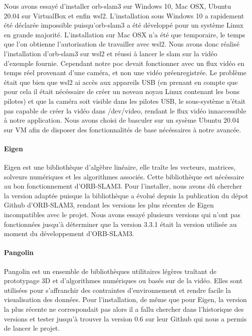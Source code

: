 \documentclass[11pt]{article}
\begin{document}
          Nous avons essayé d'installer \acrshort{orb}-\acrshort{slam}3 sur Windows 10, Mac OSX, Ubuntu 20.04 sur VirtualBox et enfin 
          \acrshort{wsl2}. L'installation sous Windows 10 a rapidement été déclarée impossible puisqu'\acrshort{orb}-\acrshort{slam}3
          a été développé pour un système Linux en grande majorité. L'installation sur Mac OSX n'a été que temporaire, le temps que l'on 
          obtienne l'autorisation de travailler avec \acrshort{wsl2}.
          Nous avons donc réalisé l'installation d'\acrshort{orb}-\acrshort{slam}3 sur \acrshort{wsl2} et réussi à lancer le \acrshort{slam}
          sur la vidéo d'exemple fournie. Cependant notre \acrshort{poc} devait fonctionner avec un flux vidéo en temps réel provenant
          d'une caméra, et non une vidéo préenregistrée. Le problème était que bien que wsl2 ai accès aux appareils USB (en prenant en compte 
          que pour cela il était nécéssaire de créer un noveau noyau Linux contenant les bons pilotes) et que la caméra soit visible dans les
          pilotes USB, le sous-système n'était pas capable de créer la vidéo dans /dev/video, rendant le flux vidéo innaccessible à notre
          application. Nous avons choisi de basculer sur un sysème Ubuntu 20.04 sur VM afin de disposer des fonctionnalités de base
          nécéssaires à notre avancée.     

        \paragraph{Eigen}
          Eigen est une bibliothèque d'algèbre linéaire, elle traîte les vecteurs, matrices, solveurs numériques et les algorithmes
          associés. Cette bibliothèque est nécéssaire au bon fonctionnement d'ORB-SLAM3. Pour l'installer, nous avons dû chercher la version 
          adaptée puisque la bibliothèque a évolué depuis la publication du dépot Github d'ORB-SLAM3, rendant les versions les plus récentes
          de Eigen incompatibles avec le projet. Nous avons essayé plusieurs versions qui n'ont pas fonctionnées jusqu'à déterminer que la version 
          3.3.1 était la version utilisée au moment du développement d'ORB-SLAM3.

        \paragraph{Pangolin}
          Pangolin est un ensemble de bibliothèques utilitaires légères traîtant de prototypage 3D et d'algorithmes numériques 
          ou basés sur de la vidéo. Elles sont utilisées pour s'affranchir des contraintes d'environnement et rendre facile la visualisation des 
          données. Pour l'installation, de même que pour Eigen, la version la plus récente ne correspondait pas alors il a fallu chercher dans 
          l'historique des versions et tester jusqu'à trouver la version 0.6 sur leur Github qui nous a permis de lancer le projet.
\end{document}
